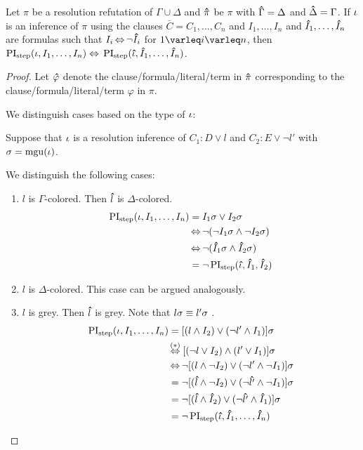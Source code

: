 \begin{lemma}
	\label{lemma:symmetry_step}
	Let $\pi$ be a resolution refutation of $\Gamma \cup \Delta$ and
	$\bm\hat{\pi}$ be $\pi$ with $\bm\hat{\Gamma} = \Delta$ and $\bm\hat{\Delta} = \Gamma$.
	If $\iota$ is an inference of $\pi$ using the clauses $\bar C = C_1, \dots, C_n$ and
	$I_1, \dots, I_n$ and 
	$\bm\hat{I}_1, \dots, \bm\hat{I}_n$ are formulas  
	such that $I_i \operatorname{\Leftrightarrow} \lnot \bm\hat{I}_i$ for $1\varleq i \varleq n$, then
	$\operatorname{PI}_{\mathrm{step}}(\iota, I_1, \dots, I_n) \;{\operatorname{\Leftrightarrow}}\; \operatorname{PI}_{\mathrm{step}}(\bm\hat{\iota}, \bm\hat{I}_1, \dots, \bm\hat{I}_n)$.
\end{lemma}
\begin{proof}
	Let $\bm\hat{\varphi}$ denote the clause/formula/literal/term in $\bm\hat{\pi}$ corresponding to the clause/formula/literal/term $\varphi$ in $\pi$.

	We distinguish cases based on the type of $\iota$:

	\begin{indproof}
			\newcommand{\p}[1]{\primex{#1}}

			Suppose that $\iota$ is a resolution inference of $C_1: D \lor l$ and $C_2: E \lor \lnot l'$ with $\sigma = \operatorname{mgu}(\iota)$.

			We distinguish the following cases:
			\begin{enumerate}
				\item $l$ is $\Gamma$-colored. Then $\bm\hat{l}$ is $\Delta$-colored.
					\begin{align*}
						\PIstep(\inference, I_1, \dots, I_n) &= I_1\sigma \lor I_2\sigma\\
													 &\semiff \lnot ( \lnot I_1\sigma \land \lnot I_2\sigma )\\
														&\semiff \lnot ( \p I_1\sigma \land \p I_2\sigma ) \\
														&= \lnot \PIstep(\primex \inference, \p I_1, \p I_2)  
					\end{align*}
				\item $l$ is $\Delta$-colored. This case can be argued analogously.

				\item $l$ is grey. Then $\bm\hat{l}$ is grey. 
					Note that $l\sigma \equiv l'\sigma$ \markB.
					\nopagebreak 
					\begin{align*}
						\PIstep(\inference, I_1, \dots, I_n) 
						&=  [(l \land I_2) \lor (\lnot l'  \land I_1)]\sigma\\
						&\hspace{-1pt}\stackrel{\mathclap{\markB}}\semiff[(\lnot l \lor I_2) \land (l' \lor I_1)]\sigma\\
						 &\semiff \lnot [(l \land \lnot I_2) \lor (\lnot l'  \land \lnot I_1)]\sigma\\
						 &= \lnot [(\p l \land\lnot I_2 ) \lor (\lnot \p{l'}\land \lnot I_1 )]\sigma\\
						 &= \lnot  [(\p l \land \p I_2 ) \lor (\lnot \p{l'} \land \p I_1)]\sigma \\
						 &= \lnot \PIstep(\p \inference, \p I_1, \dots, \p I_n)
					\end{align*}
			\end{enumerate}


\end{indproof}
\end{proof}
